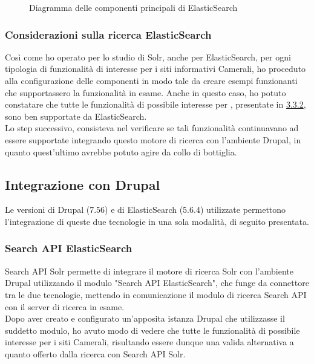 			\begin{figure}[p]
				\caption{Diagramma delle componenti principali di ElasticSearch}
			\end{figure}
			
			\subsubsection{Considerazioni sulla ricerca ElasticSearch}
			Così come ho operato per lo studio di \gls{Solr}, anche per \gls{ElasticSearch}, per ogni tipologia di funzionalità di interesse per i siti informativi Camerali, ho proceduto alla configurazione delle componenti in modo tale da creare esempi funzionanti che supportassero la funzionalità in esame. Anche in questo caso, ho potuto constatare che tutte le funzionalità di possibile interesse per \nomeAzienda, presentate in \hyperref[sub:possibile_evoluzione]{3.3.2}, sono ben supportate da \gls{ElasticSearch}. \\
			Lo step successivo, consisteva nel verificare se tali funzionalità continuavano ad essere supportate integrando questo motore di ricerca con l'ambiente \gls{Drupal}, in quanto quest'ultimo avrebbe potuto agire da collo di bottiglia.
		
		\subsection{Integrazione con Drupal}
		Le versioni di \gls{Drupal} (7.56) e di \gls{ElasticSearch} (5.6.4) utilizzate permettono l'integrazione di queste due tecnologie in una sola modalità, di seguito presentata.
		
			\subsubsection{Search API ElasticSearch}
			Search API Solr permette di integrare il motore di ricerca \gls{Solr} con l'ambiente \gls{Drupal} utilizzando il modulo "Search API ElasticSearch", che funge da connettore tra le due tecnologie, mettendo in comunicazione il modulo di ricerca \gls{Search API} con il server di ricerca in esame. \\
			Dopo aver creato e configurato un'apposita istanza \gls{Drupal} che utilizzasse il suddetto modulo, ho avuto modo di vedere che tutte le funzionalità di possibile interesse per i siti Camerali, risultando essere dunque una valida alternativa a quanto offerto dalla ricerca con Search API Solr.


